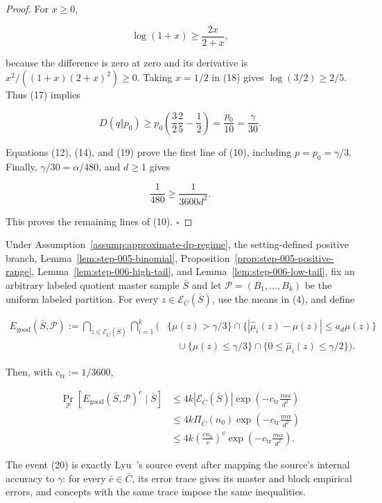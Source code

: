 \begin{proof}
For \(x\geq0\),

\[
 \log(1+x)\geq\frac{2x}{2+x},
\tag{18}
\]

because the difference is zero at zero and its derivative is
\(x^2/((1+x)(2+x)^2)\geq0\).  Taking \(x=1/2\) in (18) gives
\(\log(3/2)\geq2/5\).  Thus (17) implies

\[
 D(q\Vert p_0)
 \geq p_0\left(\frac32\frac25-\frac12\right)
 =\frac{p_0}{10}
 =\frac\gamma{30}.
\tag{19}
\]

Equations (12), (14), and (19) prove the first line of (10), including
\(p=p_0=\gamma/3\).  Finally,
\(\gamma/30=\alpha/480\), and \(d\geq1\) gives

\[
 \frac1{480}\geq\frac1{3600d^2}.
\]

This proves the remaining lines of (10). \(\square\)


\end{proof}

\begin{proposition}\label{prop:step-006-good-event}
Under Assumption~\ref{assump:approximate-dp-regime}, the setting-defined
positive branch, Lemma~\ref{lem:step-005-binomial},
Proposition~\ref{prop:step-005-positive-range},
Lemma~\ref{lem:step-006-high-tail}, and
Lemma~\ref{lem:step-006-low-tail}, fix an arbitrary labeled quotient master
sample \(\bar S\) and let \(\mathcal P=(B_1,\ldots,B_k)\) be the uniform
labeled partition.  For every
\(z\in\mathcal E_{\bar C}(\bar S)\), use the means in (4), and define

\[
\begin{aligned}
 E_{\mathrm{good}}(\bar S,\mathcal P)
 :=\bigcap_{z\in\mathcal E_{\bar C}(\bar S)}
   \bigcap_{i=1}^k
 \Big(&\{\mu(z)>\gamma/3\}
       \cap\{|\widehat\mu_i(z)-\mu(z)|\leq a_d\mu(z)\}\\
 &\quad\cup
       \{\mu(z)\leq\gamma/3\}
       \cap\{0\leq\widehat\mu_i(z)\leq\gamma/2\}\Big).
\end{aligned}
\tag{20}
\]

Then, with \(c_{\mathrm{tr}}:=1/3600\),

\[
\begin{aligned}
 \Pr_{\mathcal P}
 [E_{\mathrm{good}}(\bar S,\mathcal P)^c\mid\bar S]
 &\leq4k|\mathcal E_{\bar C}(\bar S)|
   \exp\!\left(-c_{\mathrm{tr}}\frac{m\alpha}{d^2}\right)\\
 &\leq4k\Pi_{\bar C}(n_0)
   \exp\!\left(-c_{\mathrm{tr}}\frac{m\alpha}{d^2}\right)\\
 &\leq4k\left(\frac{en_0}{v}\right)^v
   \exp\!\left(-c_{\mathrm{tr}}\frac{m\alpha}{d^2}\right).
\end{aligned}
\tag{21}
\]

The event (20) is exactly Lyu~\citep{lyu2025}'s source event after mapping the source's
internal accuracy to \(\gamma\): for every \(\bar c\in\bar C\), its error
trace gives its master and block empirical errors, and concepts with the
same trace impose the same inequalities.


\end{proposition}

